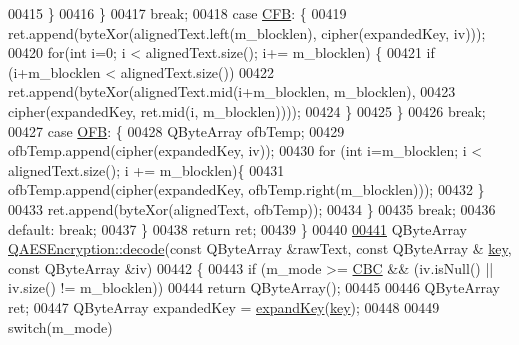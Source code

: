 \begin{DoxyCode}
00415             \}
00416         \}
00417         \textcolor{keywordflow}{break};
00418     \textcolor{keywordflow}{case} \mbox{\hyperlink{class_q_a_e_s_encryption_ad3e031c49a3d56566379d75b40b7b255ae5e2e019df35c7d172fcd7f0ebec5e8e}{CFB}}: \{
00419             ret.append(byteXor(alignedText.left(m\_blocklen), cipher(expandedKey, iv)));
00420             \textcolor{keywordflow}{for}(\textcolor{keywordtype}{int} i=0; i < alignedText.size(); i+= m\_blocklen) \{
00421                 \textcolor{keywordflow}{if} (i+m\_blocklen < alignedText.size())
00422                     ret.append(byteXor(alignedText.mid(i+m\_blocklen, m\_blocklen),
00423                                        cipher(expandedKey, ret.mid(i, m\_blocklen))));
00424             \}
00425         \}
00426         \textcolor{keywordflow}{break};
00427     \textcolor{keywordflow}{case} \mbox{\hyperlink{class_q_a_e_s_encryption_ad3e031c49a3d56566379d75b40b7b255a27e2f82decd94080893d61db4a8adcb3}{OFB}}: \{
00428             QByteArray ofbTemp;
00429             ofbTemp.append(cipher(expandedKey, iv));
00430             \textcolor{keywordflow}{for} (\textcolor{keywordtype}{int} i=m\_blocklen; i < alignedText.size(); i += m\_blocklen)\{
00431                 ofbTemp.append(cipher(expandedKey, ofbTemp.right(m\_blocklen)));
00432             \}
00433             ret.append(byteXor(alignedText, ofbTemp));
00434         \}
00435         \textcolor{keywordflow}{break};
00436     \textcolor{keywordflow}{default}: \textcolor{keywordflow}{break};
00437     \}
00438     \textcolor{keywordflow}{return} ret;
00439 \}
00440 
\mbox{\hyperlink{class_q_a_e_s_encryption_a58f972f2b66c2454edd5112495463bba}{00441}} QByteArray \mbox{\hyperlink{class_q_a_e_s_encryption_a58f972f2b66c2454edd5112495463bba}{QAESEncryption::decode}}(\textcolor{keyword}{const} QByteArray &rawText, \textcolor{keyword}{const} QByteArray &
      \mbox{\hyperlink{namespace_errors_dict_setup_a09c268098d09ffb8e5504f30fa6d5dd9}{key}}, \textcolor{keyword}{const} QByteArray &iv)
00442 \{
00443     \textcolor{keywordflow}{if} (m\_mode >= \mbox{\hyperlink{class_q_a_e_s_encryption_ad3e031c49a3d56566379d75b40b7b255a559bffc55d3599d0a172cc85aed98966}{CBC}} && (iv.isNull() || iv.size() != m\_blocklen))
00444        \textcolor{keywordflow}{return} QByteArray();
00445 
00446     QByteArray ret;
00447     QByteArray expandedKey = \mbox{\hyperlink{class_q_a_e_s_encryption_a5bfbb972f84a8376fceed648553c0912}{expandKey}}(\mbox{\hyperlink{namespace_errors_dict_setup_a09c268098d09ffb8e5504f30fa6d5dd9}{key}});
00448 
00449     \textcolor{keywordflow}{switch}(m\_mode)

\end{DoxyCode}
